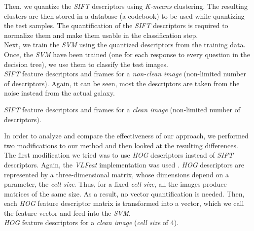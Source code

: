 \documentclass{vldb}
\begin{document}
Then, we quantize the \emph{SIFT} descriptors using \emph{K-means} clustering. The resulting clusters are then stored in a database (a codebook) to be used while quantizing the test samples. The quantification of the \emph{SIFT} descriptors is required to normalize them and make them usable in the classification step. \\

Next, we train the \emph{SVM} using the quantized descriptors from the training data. Once, the \emph{SVM} have been trained (one for each response to every question in the decision tree), we use them to classify the test images. \\

{\emph{SIFT} feature descriptors and frames for a \emph{non-clean image} (non-limited number of descriptors). Again, it can be seen, most the descriptors are taken from the noise instead from the actual galaxy.}

{\emph{SIFT} feature descriptors and frames for a \emph{clean image} (non-limited number of descriptors).}

In order to analyze and compare the effectiveness of our approach, we performed two modifications to our method and then looked at the resulting differences. \\

The first modification we tried was to use \emph{HOG} descriptors instead of \emph{SIFT} descriptors. Again, the \emph{VLFeat} implementation was used \cite{vlfeat}. \emph{HOG} descriptors are represented by a three-dimensional matrix, whose dimensions depend on a parameter, the \emph{cell size}. Thus, for a fixed \emph{cell size}, all the images produce matrices of the same size. As a result, no vector quantification is needed. Then, each \emph{HOG} feature descriptor matrix is transformed into a vector, which we call the feature vector and feed into the \emph{SVM}. \\

{\emph{HOG} feature descriptors for a \emph{clean image} (\emph{cell size} of 4).}
\end{document}
